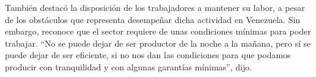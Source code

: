 \documentclass{article}%
\begin{document}
\newline%
%
También destacó la disposición de los trabajadores a mantener su labor, a pesar de los obstáculos que representa desempeñar dicha actividad en Venezuela. Sin embargo, reconoce que el sector requiere de unas condiciones mínimas para poder trabajar.%
\newline%
%
“No se puede dejar de ser productor de la noche a la mañana, pero sí se puede dejar de ser eficiente, si no nos dan las condiciones para que podamos producir con tranquilidad y con algunas garantías mínimas”, dijo.%
\newline%
%
\end{document}
